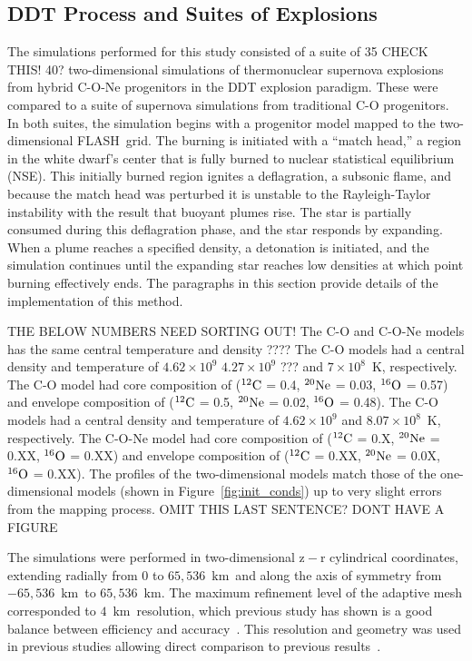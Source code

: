 \documentclass[iop,apj]{emulateapj}
\newcommand{\figref}[1]{Figure~\ref{#1}}
\newcommand{\C}[1]{\ensuremath{{}^{#1}{\rm C}}}
\newcommand{\Ox}[1]{\ensuremath{{}^{#1}{\rm O}}}
\newcommand{\Ne}[1]{\ensuremath{{}^{#1}{\rm Ne}}}
\newcommand{\code}[1]{\textsc{#1}}
\newcommand{\FLASH}{\code{FLASH}}
\newcommand{\unitstyle}[1]{\ensuremath{\mathrm{#1}}}
\newcommand{\kilo}{\unitstyle{k}}
\newcommand{\meter}{\unitstyle{m}}
\newcommand{\km}{\kilo\meter}   %
\begin{document}
\subsection{DDT Process and Suites of Explosions}

The simulations performed for this study consisted of a suite of
{\color{red} 35 CHECK THIS! 40?} two-dimensional simulations of
thermonuclear supernova
explosions from hybrid C-O-Ne progenitors in the DDT explosion paradigm. These
were compared to a suite of supernova simulations from traditional
C-O progenitors. In both suites, the simulation
begins with a progenitor model mapped to the two-dimensional
\FLASH\ grid. The burning is initiated with a ``match head,'' a region
in the white dwarf's center that is fully burned to nuclear statistical
equilibrium (NSE).
This initially burned region ignites a deflagration, a subsonic
flame, and because the match head was perturbed it is unstable to
the Rayleigh-Taylor instability with the result that buoyant plumes
rise. The star is partially consumed during this deflagration phase,
and the star responds by expanding.
When a plume reaches a specified density,
a detonation is initiated, and the simulation continues until
the expanding star reaches low densities at which point burning
effectively ends. The paragraphs in this section provide details
of the implementation of this method.


{\color{red} THE BELOW NUMBERS NEED SORTING OUT!}
The C-O and C-O-Ne models has the same central temperature
and density ????
The C-O models had a central density and
temperature of $4.62 \times 10^{9}$ $4.27 \times 10^{9}$ ???
and $7 \times 10^8$~K, respectively.
The C-O model had core composition of (\C{12} = 0.4,
\Ne{20} = 0.03, \Ox{16} = 0.57) and envelope composition
of (\C{12} = 0.5, \Ne{20} = 0.02, \Ox{16} = 0.48).
The C-O models had a central density and
temperature of $4.62 \times 10^{9}$
and $8.07 \times 10^8$~K, respectively.
The C-O-Ne model had core composition of (\C{12} = 0.X,
\Ne{20} = 0.XX, \Ox{16} = 0.XX) and envelope composition
of (\C{12} = 0.XX, \Ne{20} = 0.0X, \Ox{16} = 0.XX).
The profiles of the two-dimensional models match those of
the one-dimensional models (shown in \figref{fig:init_conds})
up to very slight errors from the mapping process. {\color{red}
OMIT THIS LAST SENTENCE? DONT HAVE A FIGURE}

The simulations were performed in two-dimensional $\mathrm{z-r}$
cylindrical coordinates, extending radially from 0 to
$65,536$~\km\ and along the axis of symmetry from $-65,536$~\km\ to
$65,536$~\km. The maximum refinement level of the adaptive mesh
corresponded to $4$~\km\ resolution, which previous study has shown
is a good balance between efficiency and
accuracy~\citep{townsley.calder.ea:flame,townetal2009}.
This resolution and geometry was used in previous studies
allowing direct comparison to previous results~\citep{kruegetal12}.
\end{document}
